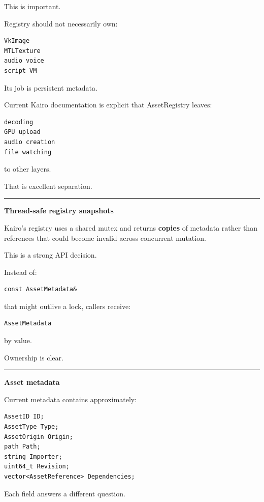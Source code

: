 This is important.

Registry should not necessarily own:

\begin{verbatim}
VkImage
MTLTexture
audio voice
script VM
\end{verbatim}

Its job is persistent metadata.

Current Kairo documentation is explicit that AssetRegistry leaves:

\begin{verbatim}
decoding
GPU upload
audio creation
file watching
\end{verbatim}

to other layers.

That is excellent separation.

\begin{center}\rule{0.5\linewidth}{0.5pt}\end{center}

\textbf{Thread-safe registry snapshots}

Kairo's registry uses a shared mutex and returns \textbf{copies} of metadata rather than references that could become invalid across concurrent mutation.

This is a strong API decision.

Instead of:

\begin{verbatim}
const AssetMetadata&
\end{verbatim}

that might outlive a lock, callers receive:

\begin{verbatim}
AssetMetadata
\end{verbatim}

by value.

Ownership is clear.

\begin{center}\rule{0.5\linewidth}{0.5pt}\end{center}

\textbf{Asset metadata}

Current metadata contains approximately:

\begin{verbatim}
AssetID ID;
AssetType Type;
AssetOrigin Origin;
path Path;
string Importer;
uint64_t Revision;
vector<AssetReference> Dependencies;
\end{verbatim}

Each field answers a different question.

